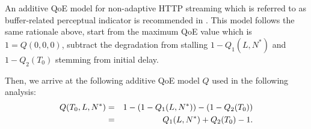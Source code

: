 An additive \gls{QoE} model for non-adaptive HTTP streaming which is referred to as buffer-related perceptual indicator is recommended in \cite{ITUT2012}. This model follows the same rationale above, start from the maximum QoE value which is \(1=Q(0,0,0)\), subtract the degradation from stalling \(1-Q_1(L,N^*)\) and \(1-Q_2(T_0)\) stemming from initial delay.

Then, we arrive at the following additive QoE model \(Q\) used in the following analysis:  
\begin{eqnarray}
  Q(T_0,L,N^*) &=& 1-(1-Q_1(L,N^*)) - (1-Q_2(T_0)) \notag\\
   &=& Q_1(L,N^*) + Q_2(T_0) - 1.
\label{eq:application:qoe_user_behaviour:typical_user_scenarios:youtube_qoe:combined:qsum}
\end{eqnarray}
